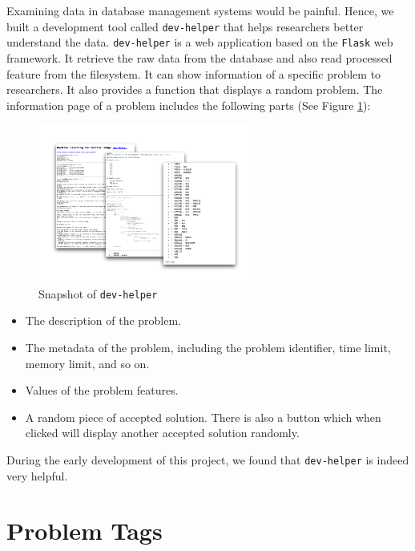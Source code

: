    Examining data in database management systems would be painful.
    Hence, we built a development tool called \texttt{dev-helper}
    that helps researchers better understand the data.
    \texttt{dev-helper} is a web application based on the \texttt{Flask}\cite{flask} web framework.
    It retrieve the raw data from the database and also read processed feature from the filesystem.
    It can show information of a specific problem to researchers.
    It also provides a function that displays a random problem.
    The information page of a problem includes the following parts (See Figure \ref{fig:dev-helper}):

    \begin{figure}[htp]
        \centering
        \includegraphics[width=0.62\textwidth]{img/dev-helper.pdf}
        \caption{Snapshot of \texttt{dev-helper}}
        \label{fig:dev-helper}
    \end{figure}

    \begin{itemize}
        \item The description of the problem.
        \item The metadata of the problem, including the problem identifier, time limit, memory limit, and so on.
        \item Values of the problem features.
        \item A random piece of accepted solution.
            There is also a button which when clicked will display another accepted solution randomly.
    \end{itemize}

    During the early development of this project, we found that \texttt{dev-helper} is indeed very helpful.

\section{Problem Tags}

